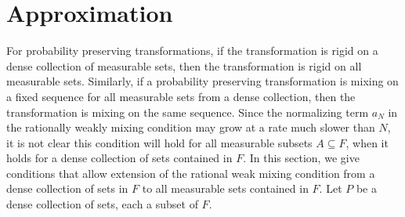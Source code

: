 \documentclass[12pt]{amsart}
\begin{document}
\section{Approximation}
For probability preserving transformations, 
if the transformation is rigid on a dense collection 
of measurable sets, then the transformation is rigid on all measurable sets. 
Similarly, if a probability preserving transformation is mixing on a fixed sequence 
for all measurable sets from a dense collection, then the transformation is mixing 
on the same sequence. 
Since the normalizing term $a_N$ in the rationally weakly mixing condition may grow 
at a rate much slower than $N$, it is not clear this condition will hold for all 
measurable subsets $A\subseteq F$, when it holds for a dense collection of sets 
contained in $F$.  In this section, we give conditions that allow extension 
of the rational weak mixing condition from a dense collection of sets in $F$ 
to all measurable sets contained in $F$. Let $P$ be a dense collection of sets, 
each a subset of $F$. 
\end{document}
